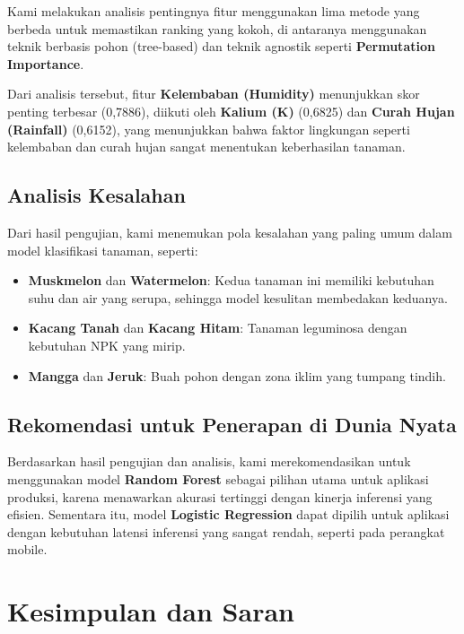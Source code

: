 \documentclass{article} %
\begin{document}
Kami melakukan analisis pentingnya fitur menggunakan lima metode yang berbeda untuk memastikan ranking yang kokoh, di antaranya menggunakan teknik berbasis pohon (tree-based) dan teknik agnostik seperti \textbf{Permutation Importance}.

Dari analisis tersebut, fitur \textbf{Kelembaban (Humidity)} menunjukkan skor penting terbesar (0,7886), diikuti oleh \textbf{Kalium (K)} (0,6825) dan \textbf{Curah Hujan (Rainfall)} (0,6152), yang menunjukkan bahwa faktor lingkungan seperti kelembaban dan curah hujan sangat menentukan keberhasilan tanaman.

\subsection{Analisis Kesalahan}

Dari hasil pengujian, kami menemukan pola kesalahan yang paling umum dalam model klasifikasi tanaman, seperti:

\begin{itemize}
    \item \textbf{Muskmelon} dan \textbf{Watermelon}: Kedua tanaman ini memiliki kebutuhan suhu dan air yang serupa, sehingga model kesulitan membedakan keduanya.
    \item \textbf{Kacang Tanah} dan \textbf{Kacang Hitam}: Tanaman leguminosa dengan kebutuhan NPK yang mirip.
    \item \textbf{Mangga} dan \textbf{Jeruk}: Buah pohon dengan zona iklim yang tumpang tindih.
\end{itemize}

\subsection{Rekomendasi untuk Penerapan di Dunia Nyata}
Berdasarkan hasil pengujian dan analisis, kami merekomendasikan untuk menggunakan model \textbf{Random Forest} sebagai pilihan utama untuk aplikasi produksi, karena menawarkan akurasi tertinggi dengan kinerja inferensi yang efisien. Sementara itu, model \textbf{Logistic Regression} dapat dipilih untuk aplikasi dengan kebutuhan latensi inferensi yang sangat rendah, seperti pada perangkat mobile.



\section{Kesimpulan dan Saran}
\end{document}
